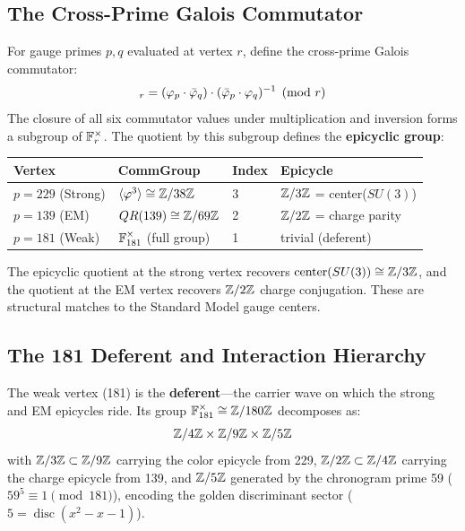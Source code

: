 \subsection{The Cross-Prime Galois Commutator}

For gauge primes $p, q$ evaluated at vertex $r$, define the cross-prime Galois commutator:
\begin{equation}
    [p,q]_r = (\vp_p \cdot \vpbar_q) \cdot (\vpbar_p \cdot \vp_q)^{-1} \pmod{r}
\end{equation}
The closure of all six commutator values under multiplication and inversion forms a subgroup of $\mathbb{F}_r^{\times}$. The quotient by this subgroup defines the \textbf{epicyclic group}:

\begin{center}
\begin{tabular}{llll}
\hline
Vertex & CommGroup & Index & Epicycle \\
\hline
$p=229$ (Strong) & $\langle \varphi^3 \rangle \cong \mathbb{Z}/38\mathbb{Z}$ & 3 & $\mathbb{Z}/3\mathbb{Z}$ = center($SU(3)$) \\
$p=139$ (EM) & $QR(139) \cong \mathbb{Z}/69\mathbb{Z}$ & 2 & $\mathbb{Z}/2\mathbb{Z}$ = charge parity \\
$p=181$ (Weak) & $\mathbb{F}_{181}^{\times}$ (full group) & 1 & trivial (deferent) \\
\hline
\end{tabular}
\end{center}

The epicyclic quotient at the strong vertex recovers $\operatorname{center}(SU(3)) \cong \mathbb{Z}/3\mathbb{Z}$, and the quotient at the EM vertex recovers $\mathbb{Z}/2\mathbb{Z}$ charge conjugation. These are structural matches to the Standard Model gauge centers.

\subsection{The 181 Deferent and Interaction Hierarchy}

The weak vertex (181) is the \textbf{deferent}---the carrier wave on which the strong and EM epicycles ride. Its group $\mathbb{F}_{181}^{\times} \cong \mathbb{Z}/180\mathbb{Z}$ decomposes as:
\begin{equation}
    \mathbb{Z}/4\mathbb{Z} \times \mathbb{Z}/9\mathbb{Z} \times \mathbb{Z}/5\mathbb{Z}
\end{equation}
with $\mathbb{Z}/3\mathbb{Z} \subset \mathbb{Z}/9\mathbb{Z}$ carrying the color epicycle from 229, $\mathbb{Z}/2\mathbb{Z} \subset \mathbb{Z}/4\mathbb{Z}$ carrying the charge epicycle from 139, and $\mathbb{Z}/5\mathbb{Z}$ generated by the chronogram prime 59 ($59^5 \equiv 1 \pmod{181}$), encoding the golden discriminant sector ($5 = \operatorname{disc}(x^2 - x - 1)$).

